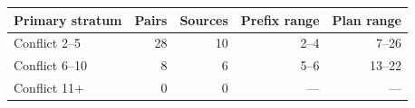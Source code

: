 \begin{tabular}{lrrrr}\toprule
Primary stratum & Pairs & Sources & Prefix range & Plan range\\\midrule
Conflict 2--5 & 28 & 10 & 2--4 & 7--26\\
Conflict 6--10 & 8 & 6 & 5--6 & 13--22\\
Conflict 11+ & 0 & 0 & --- & ---\\
\bottomrule\end{tabular}
